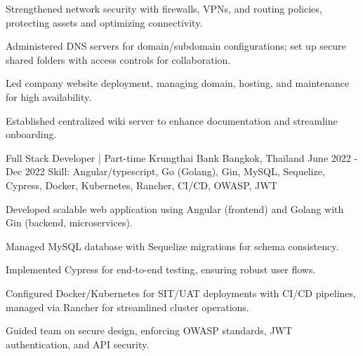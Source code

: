 \begin{cventries}
{\begin{cvitems}
      \item {Strengthened network security with firewalls, VPNs, and routing policies, protecting assets and optimizing connectivity.}
      \item {Administered DNS servers for domain/subdomain configurations; set up secure shared folders with access controls for collaboration.}
      \item {Led company website deployment, managing domain, hosting, and maintenance for high availability.}
      \item {Established centralized wiki server to enhance documentation and streamline onboarding.}
      \end{cvitems}
    }

\cventry
  {Full Stack Developer | Part-time} %
  {Krungthai Bank} %
  {Bangkok, Thailand} %
  {June 2022 - Dec 2022} %
  {Skill: Angular/typescript, Go (Golang), Gin, MySQL, Sequelize, Cypress, Docker, Kubernetes, Rancher, CI/CD, OWASP, JWT} %
  {
    \begin{cvitems} %
      \item {Developed scalable web application using Angular (frontend) and Golang with Gin (backend, microservices).}
      \item {Managed MySQL database with Sequelize migrations for schema consistency.}
      \item {Implemented Cypress for end-to-end testing, ensuring robust user flows.}
      \item {Configured Docker/Kubernetes for SIT/UAT deployments with CI/CD pipelines, managed via Rancher for streamlined cluster operations.}
      \item {Guided team on secure design, enforcing OWASP standards, JWT authentication, and API security.}
    \end{cvitems}
  }


\end{cventries}

